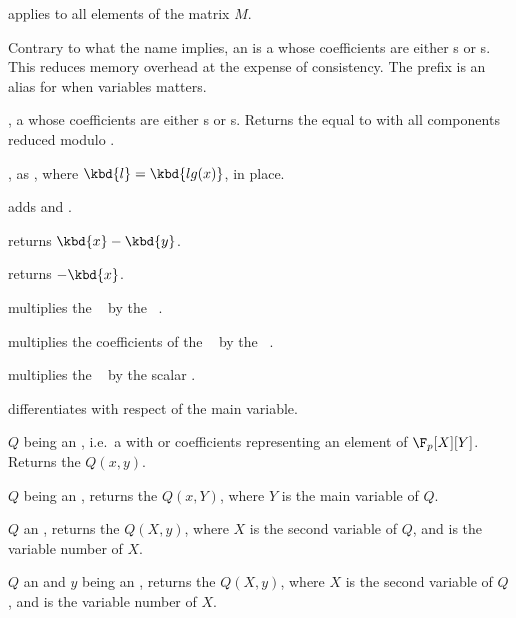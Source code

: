  applies
 to all elements of the matrix $M$.

Contrary to what the name implies, an  is a  whose
coefficients are either s or s. This reduces memory
overhead at the expense of consistency. The prefix  is an
alias for  when variables matters.

,  a  whose coefficients are
either s or s. Returns the  equal to  with
all components reduced modulo .

, as , where
$\kbd{l} = \kbd{lg(x)}$, in place.

 adds  and .

 returns $\kbd{x}-\kbd{y}$.

 returns $-\kbd{x}$.

 multiplies the ~
by the ~.

 multiplies the coefficients of the
~ by the ~.

 multiplies the ~
by the scalar .

 differentiates  with respect of
the main variable.

 $Q$ being an ,
i.e.~a  with  or  coefficients representing an
element of $\F_p[X][Y]$. Returns the  $Q(x,y)$.

 $Q$ being an , returns the
 $Q(x,Y)$, where $Y$ is the main variable of $Q$.

 $Q$ an , returns
the  $Q(X,y)$, where $X$ is the second variable of $Q$, and 
is the variable number of $X$.

 $Q$ an 
and $y$ being an , returns the  $Q(X,y)$, where $X$ is the
second variable of $Q$, and  is the variable number of $X$.

